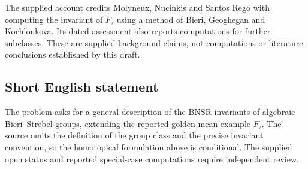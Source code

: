 \documentclass[11pt]{article}
\begin{document}
The supplied account credits Molyneux, Nucinkis and Santos Rego with computing the invariant of \(F_\tau\) using a method of Bieri, Geoghegan and Kochloukova. Its dated assessment also reports computations for further subclasses. These are supplied background claims, not computations or literature conclusions established by this draft.
\subsection{Short English statement}
The problem asks for a general description of the BNSR invariants of algebraic Bieri--Strebel groups, extending the reported golden-mean example \(F_\tau\). The source omits the definition of the group class and the precise invariant convention, so the homotopical formulation above is conditional. The supplied open status and reported special-case computations require independent review.
\end{document}
